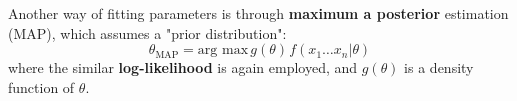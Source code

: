 \documentclass[letterpaper, 10.5pt,landscape]{article}
\makeatletter
\renewcommand{\section}{\@startsection{section}{1}{0mm}%
                                {-1ex plus -.5ex minus -.2ex}%
                                {0.1ex plus .2ex}%
                                {\normalfont\small}}
\makeatother
\begin{document}
\begin{multicols*}{3}
Another way of fitting parameters is through \textbf{maximum a posterior} estimation (MAP), which assumes a "prior distribution":
\vspace{-3pt}
\[\boxed{\theta_{\text{MAP}} = \text{arg max} \hspace{2pt} g(\theta) \hspace{1pt} f\left(x_{1} \ldots x_{n} | \theta \right)} \]
where the similar \textbf{log-likelihood} is again employed, and $g(\theta)$ is a density function of $\theta$.


\vspace*{\fill}














































\end{multicols*}
\end{document}
